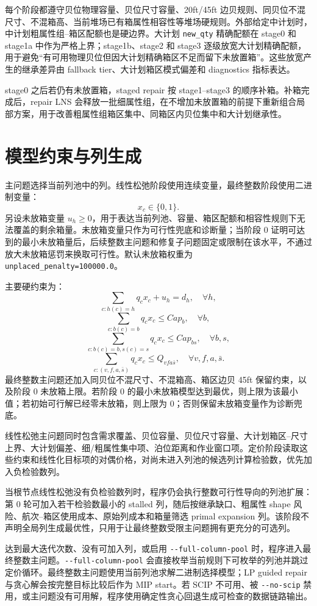 \documentclass[UTF8,a4paper,11pt]{ctexart}
\newcommand{\code}[1]{\nolinkurl{#1}}
\begin{document}
每个阶段都遵守贝位物理容量、贝位尺寸容量、20ft/45ft 边贝规则、同贝位不混尺寸、不混箱高、当前堆场已有箱属性相容性等堆场硬规则。外部给定中计划时，中计划粗属性组--箱区配额也是硬边界。大计划 \code{new\_qty} 精确配额在 stage0 和 stage1a 中作为严格上界；stage1b、stage2 和 stage3 逐级放宽大计划精确配额，用于避免“有可用物理贝位但因大计划精确箱区不足而留下未放置箱”。这些放宽产生的继承差异由 fallback tier、大计划箱区模式偏差和 diagnostics 指标表达。

stage0 之后若仍有未放置箱，staged repair 按 stage1--stage3 的顺序补箱。补箱完成后，repair LNS 会释放一批细属性组，在不增加未放置箱的前提下重新组合局部方案，用于改善粗属性组箱区集中、同箱区内贝位集中和大计划继承性。

\section{模型约束与列生成}

主问题选择当前列池中的列。线性松弛阶段使用连续变量，最终整数阶段使用二进制变量：
\[
x_c \in \{0,1\}.
\]
另设未放箱变量 \(u_h\ge 0\)，用于表达当前列池、容量、箱区配额和相容性规则下无法覆盖的剩余箱量。未放箱变量只作为可行性兜底和诊断量；当阶段 0 证明可达到的最小未放箱量后，后续整数主问题和修复子问题固定或限制在该水平，不通过放大未放箱惩罚来换取可行性。默认未放箱权重为 \code{unplaced_penalty=100000.0}。

主要硬约束为：
\[
\sum_{c:h(c)=h} q_cx_c+u_h=d_h,\quad \forall h,
\]
\[
\sum_{c:b(c)=b} q_cx_c \le Cap_b,\quad \forall b,
\]
\[
\sum_{c:b(c)=b,s(c)=s} q_cx_c \le Cap_{bs},\quad \forall b,s,
\]
\[
\sum_{c:(v,f,a,\bar{s})} q_cx_c \le Q_{vfa\bar{s}},\quad \forall v,f,a,\bar{s}.
\]
最终整数主问题还加入同贝位不混尺寸、不混箱高、箱区边贝 45ft 保留约束，以及阶段 0 未放箱上限。若阶段 0 的最小未放箱模型达到最优，则上限为该最小值；若初始可行解已经零未放箱，则上限为 0；否则保留未放箱变量作为诊断兜底。

线性松弛主问题同时包含需求覆盖、贝位容量、贝位尺寸容量、大计划箱区--尺寸上界、大计划偏差、细/粗属性集中项、泊位距离和作业窗口项。定价阶段读取这些约束和线性化目标项的对偶价格，对尚未进入列池的候选列计算检验数，优先加入负检验数列。

当根节点线性松弛没有负检验数列时，程序仍会执行整数可行性导向的列池扩展：第 0 轮可加入若干检验数最小的 stalled 列，随后按继承缺口、粗属性 shape 风险、航次--箱区使用成本、原始列成本和箱量筛选 primal expansion 列。该阶段不声明全局列生成最优性，只用于让最终整数受限主问题拥有更充分的可选列。

达到最大迭代次数、没有可加入列，或启用 \code{--full-column-pool} 时，程序进入最终整数主问题。\code{--full-column-pool} 会直接枚举当前规则下可枚举的列池并跳过定价循环。最终整数主问题使用当前列池求解二进制选择模型；LP guided repair 与贪心解会按完整目标比较后作为 MIP start。若 SCIP 不可用、被 \code{--no-scip} 禁用，或主问题没有可用解，程序使用确定性贪心回退生成可检查的数据链路输出。
\end{document}
